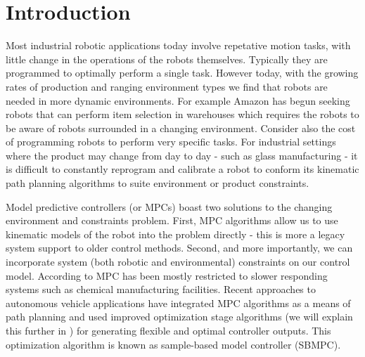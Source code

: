\documentclass[main.tex]{subfile}
\begin{document}
\section{Introduction} 
\label{sec:introduction}

Most industrial robotic applications today involve repetative motion tasks, with
little change in the operations of the robots themselves. Typically they are
programmed to optimally perform a single task. However today, with the growing
rates of production and ranging environment types we find that robots are needed
in more dynamic environments. For example Amazon has begun seeking robots that
can perform item selection in warehouses \cite{amazon} which requires the robots
to be aware of robots surrounded in a changing environment. Consider also the
cost of programming robots to perform very specific tasks. For industrial
settings where the product may change from day to day - such as glass
manufacturing - it is difficult to constantly reprogram and calibrate a robot to
conform its kinematic path planning algorithms to suite environment or product
constraints. 

Model predictive controllers (or MPCs) boast two solutions to the changing
environment and constraints problem. First, MPC algorithms allow us to use
kinematic models of the robot into the problem directly - this is more a legacy
system support to older control methods. Second, and more importantly, we can
incorporate system (both robotic and environmental) constraints on our control
model. According to \cite{autoVehicle} MPC has been mostly restricted to slower
responding systems such as chemical manufacturing facilities. Recent approaches
to autonomous vehicle applications have integrated MPC algorithms as a means of
path planning \cite{auv,uphill} and used improved optimization stage algorithms
(we will explain this further in ) for generating flexible and
optimal controller outputs. This optimization algorithm is known as sample-based
model controller (SBMPC).

\end{document}
